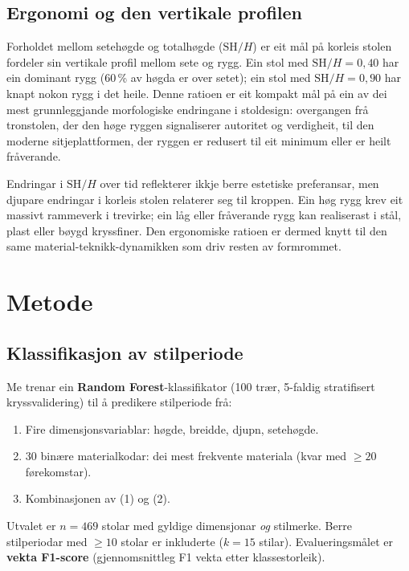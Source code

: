 \documentclass[10pt, a4paper, twocolumn]{article}
\begin{document}
\subsection{Ergonomi og den vertikale profilen}

Forholdet mellom setehøgde og totalhøgde ($\text{SH}/H$) er eit mål på korleis stolen fordeler sin vertikale profil mellom sete og rygg. Ein stol med $\text{SH}/H = 0{,}40$ har ein dominant rygg (60\,\% av høgda er over setet); ein stol med $\text{SH}/H = 0{,}90$ har knapt nokon rygg i det heile. Denne ratioen er eit kompakt mål på ein av dei mest grunnleggjande morfologiske endringane i stoldesign: overgangen frå tronstolen, der den høge ryggen signaliserer autoritet og verdigheit, til den moderne sitjeplattformen, der ryggen er redusert til eit minimum eller er heilt fråverande.

Endringar i $\text{SH}/H$ over tid reflekterer ikkje berre estetiske preferansar, men djupare endringar i korleis stolen relaterer seg til kroppen. Ein høg rygg krev eit massivt rammeverk i trevirke; ein låg eller fråverande rygg kan realiserast i stål, plast eller bøygd kryssfiner. Den ergonomiske ratioen er dermed knytt til den same material-teknikk-dynamikken som driv resten av formrommet.


\section{Metode}

\subsection{Klassifikasjon av stilperiode}

Me trenar ein \textbf{Random Forest}-klassifikator (100 trær, 5-faldig stratifisert kryssvalidering) til å predikere stilperiode frå:
\begin{enumerate}
  \item Fire dimensjonsvariablar: høgde, breidde, djupn, setehøgde.
  \item 30 binære materialkodar: dei mest frekvente materiala (kvar med $\geq 20$ førekomstar).
  \item Kombinasjonen av (1) og (2).
\end{enumerate}

Utvalet er $n = 469$ stolar med gyldige dimensjonar \emph{og} stilmerke. Berre stilperiodar med $\geq 10$ stolar er inkluderte ($k = 15$ stilar). Evalueringsmålet er \textbf{vekta F1-score} (gjennomsnittleg F1 vekta etter klassestorleik).
\end{document}
